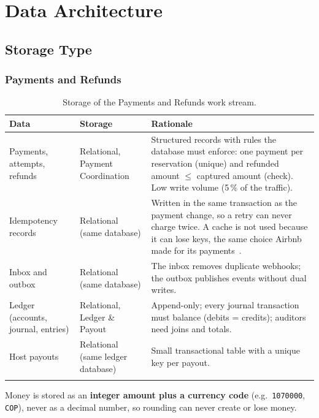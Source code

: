 \section{Data Architecture}


\subsection{Storage Type}

\begingroup
\setlength{\emergencystretch}{3em}
\subsubsection{Payments and Refunds}
\label{sec:pay-storage}

\begin{longtable}{@{}L{3.4cm}L{3.0cm}L{7.4cm}@{}}
\toprule
\textbf{Data} & \textbf{Storage} & \textbf{Rationale} \\
\midrule
\endhead
Payments, attempts, refunds & Relational, Payment Coordination &
  Structured records with rules the database must enforce: one payment per
  reservation (unique) and refunded amount $\leq$ captured amount (check).
  Low write volume (5\,\% of the traffic). \\
Idempotency records & Relational (same database) &
  Written in the same transaction as the payment change, so a retry can never
  charge twice. A cache is not used because it can lose keys, the same choice
  Airbnb made for its payments~\cite{airbnb-orpheus}. \\
Inbox and outbox & Relational (same database) &
  The inbox removes duplicate webhooks; the outbox publishes events without
  dual writes. \\
Ledger (accounts, journal, entries) & Relational, Ledger \& Payout &
  Append-only; every journal transaction must balance (debits = credits);
  auditors need joins and totals. \\
Host payouts & Relational (same ledger database) &
  Small transactional table with a unique key per payout. \\
\bottomrule
\caption{Storage of the Payments and Refunds work stream.}
\label{tab:pay-storage}
\end{longtable}

Money is stored as an \textbf{integer amount plus a currency code} (e.g.\
\texttt{1070000}, \texttt{COP}), never as a decimal number, so rounding can
never create or lose money.
\endgroup

